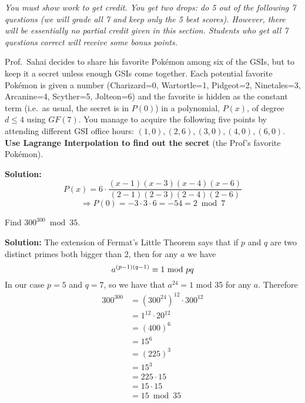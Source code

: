 \documentclass[11pt,fleqn]{article}
\newcommand{\fillin}[1]{\underline{\hskip #1}}
\newcommand{\startnewpage}{\newpage \noindent \vspace{0mm} {\sc Print} your name and student ID: \fillin{5in}\\[-0.2in]}
\renewcommand{\answer}[1]{{\color{mydarkblue}\textbf{Solution: }#1}}
\begin{document}
\begin{qunlist}
\textit{You must show work to get credit. You get two drops: do 5 out
  of the following 7 questions (we will grade all 7 and keep only the
  5 best scores). However, there will be essentially no partial credit
  given in this section. Students who get all 7 questions correct will
  receive some bonus points.}  


Prof.~Sahai decides to share his favorite Pok\'emon among six of the
GSIs, but to keep it a secret unless enough GSIs come together. Each
potential favorite Pok\'emon is given a number (Charizard=0,
Wartortle=1, Pidgeot=2, Ninetales=3, Arcanine=4, Scyther=5, Jolteon=6)
and the favorite is hidden as the constant term (i.e.~as usual, the
secret is in $P(0)$) in a polynomial, $P(x)$, of degree $d \leq 4$
using $GF(7)$. You manage to acquire the following five points by
attending different GSI office hours: $(1,0), (2,6), (3,0), (4,0),
(6,0)$. {\bf Use Lagrange Interpolation to find out the secret} (the
Prof's favorite Pok\'emon).

\answer{ 
\[ P(x) = 6 \cdot \frac{(x-1)(x-3)(x-4)(x-6)}{(2-1)(2-3)(2-4)(2-6)} \]
\[ \Rightarrow P(0) = -3 \cdot 3 \cdot 6 = -54 = \boxed{2 \bmod 7} \]
}

\vspace{1in}


Find $300^{300} \bmod 35$.

\answer{
The extension of Fermat's Little Theorem says that if $p$ and $q$ are two distinct primes both bigger than 2, then for any $a$ we have 
\[
a^{(p-1)(q-1)} \equiv 1$ mod $pq
\]
In our case $p=5$ and $q=7$, so we have that $a^{24} = 1$ mod 35 for any $a$. Therefore
\begin{align*}
300^{300} &= (300^{24})^{12} \cdot 300^{12} \\
&= 1^{12} \cdot 20^{12} \\
&= (400)^6 \\
&= 15^6 \\
&= (225)^3 \\
&=15^3 \\
&=225\cdot 15 \\
&= 15 \cdot 15 \\
&= \boxed{15 \bmod 35}
\end{align*}
}



\end{qunlist}
\end{document}
